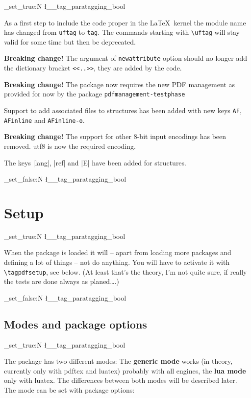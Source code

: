 \documentclass[DIV=12,parskip=half-,bibliography=totoc]{scrartcl}
\newcommand\parataggingON {\bool_set_true:N \l__tag_paratagging_bool}
\newcommand\parataggingOff{\bool_set_false:N \l__tag_paratagging_bool}
\begin{document}
\parataggingON

As a first step to include the code proper in the \LaTeX\ kernel the module name has changed from \texttt{uftag} to \texttt{tag}. The commands starting with \verb|\uftag| will stay valid for some time but then be deprecated.

\textbf{Breaking change!} The argument of \texttt{newattribute} option should no longer add the dictionary bracket \verb+<<..>>+, they are added by the code.


\textbf{Breaking change!} The package now requires the new PDF management as provided for now by the package \texttt{pdfmanagement-testphase}

Support to add associated files to structures has been added with new keys \texttt{AF}, \texttt{AFinline} and \texttt{AFinline-o}.

\textbf{Breaking change!} The support for other 8-bit input encodings has been removed.
utf8 is now the required encoding.

The keys |lang|, |ref| and |E| have been added for structures.

\parataggingOff

\section{Setup}


\parataggingON

When the package is loaded it will -- apart from loading more packages and defining a lot of things -- not do anything. You will have to activate it with \verb+\tagpdfsetup+, see below. (At least that's the theory, I'm not quite sure, if really the tests are done always as planed\ldots.)

\parataggingOff



\subsection{Modes and package options}

\parataggingON


The package has two different modes: The \textbf{generic mode} works (in theory, currently only with pdftex and luatex) probably with all engines, the \textbf{lua mode} only with luatex. The differences between both modes  will be described later. The mode can be set with package options:
\end{document}
